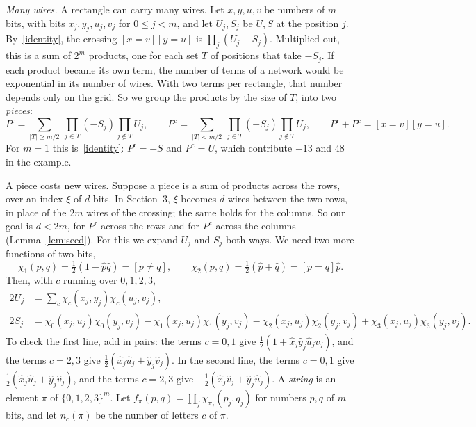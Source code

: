 \documentclass[11pt]{article}
\begin{document}
\emph{Many wires.} A rectangle can carry many wires. Let $x,y,u,v$ be numbers of $m$ bits, with bits $x_j,y_j,u_j,v_j$ for $0\le j<m$, and let $U_j,S_j$ be $U,S$ at the position $j$. By~\eqref{identity}, the crossing $[x=v][y=u]$ is $\prod_j(U_j-S_j)$. Multiplied out, this is a sum of $2^m$ products, one for each set $T$ of positions that take $-S_j$. If each product became its own term, the number of terms of a network would be exponential in its number of wires. With two terms per rectangle, that number depends only on the grid. So we group the products by the size of $T$, into two \emph{pieces}:
\[
P^{\mathrm r}=\sum_{|T|\ge m/2}\ \prod_{j\in T}(-S_j)\prod_{j\notin T}U_j,\qquad P^{\mathrm c}=\sum_{|T|<m/2}\ \prod_{j\in T}(-S_j)\prod_{j\notin T}U_j,\qquad P^{\mathrm r}+P^{\mathrm c}=[x=v][y=u].
\]
For $m=1$ this is~\eqref{identity}: $P^{\mathrm r}=-S$ and $P^{\mathrm c}=U$, which contribute $-13$ and $48$ in the example.

A piece costs new wires. Suppose a piece is a sum of products across the rows, over an index $\xi$ of $d$ bits. In Section~3, $\xi$ becomes $d$ wires between the two rows, in place of the $2m$ wires of the crossing; the same holds for the columns. So our goal is $d<2m$, for $P^{\mathrm r}$ across the rows and for $P^{\mathrm c}$ across the columns (Lemma~\ref{lem:seed}). For this we expand $U_j$ and $S_j$ both ways. We need two more functions of two bits,
\[
\chi_1(p,q)=\tfrac12(1-\hat p\hat q)=[p\ne q],\qquad\chi_2(p,q)=\tfrac12(\hat p+\hat q)=[p=q]\hat p.
\]
Then, with $c$ running over $0,1,2,3$,
\begin{align*}
2U_j&=\sum_{c}\chi_c(x_j,y_j)\chi_c(u_j,v_j),\\
2S_j&=\chi_0(x_j,u_j)\chi_0(y_j,v_j)-\chi_1(x_j,u_j)\chi_1(y_j,v_j)-\chi_2(x_j,u_j)\chi_2(y_j,v_j)+\chi_3(x_j,u_j)\chi_3(y_j,v_j).
\end{align*}
To check the first line, add in pairs: the terms $c=0,1$ give $\tfrac12(1+\hat x_j\hat y_j\hat u_j\hat v_j)$, and the terms $c=2,3$ give $\tfrac12(\hat x_j\hat u_j+\hat y_j\hat v_j)$. In the second line, the terms $c=0,1$ give $\tfrac12(\hat x_j\hat u_j+\hat y_j\hat v_j)$, and the terms $c=2,3$ give $-\tfrac12(\hat x_j\hat v_j+\hat y_j\hat u_j)$. A \emph{string} is an element $\pi$ of $\{0,1,2,3\}^m$. Let $f_\pi(p,q)=\prod_j\chi_{\pi_j}(p_j,q_j)$ for numbers $p,q$ of $m$ bits, and let $n_c(\pi)$ be the number of letters $c$ of $\pi$.
\end{document}
